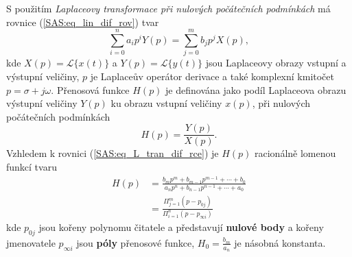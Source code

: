       S použitím \emph{Laplaceovy transformace při nulových počátečních podmínkách} má rovnice
      (\ref{SAS:eq_lin_dif_rov}) tvar
      \begin{equation}\label{SAS:eq_L_tran_dif_rce}
        \sum_{i=0}^na_ip^iY(p)=\sum_{j=0}^mb_jp^jX(p),
      \end{equation}
      kde $X(p)=\mathcal{L}\{x(t)\}$ a $Y(p)=\mathcal{L}\{y(t)\}$ jsou Laplaceovy obrazy vstupní a
      výstupní veličiny, $p$ je Laplaceův operátor derivace a také komplexní kmitočet 
      $p=\sigma+j\omega$. Přenosová funkce $H(p)$ je definována jako podíl Laplaceova obrazu 
      výstupní veličiny $Y(p)$ ku obrazu vstupní veličiny $x(p)$, při nulových počátečních 
      podmínkách
      \begin{equation}\label{SAS:eq_Hp_popis}
          H(p)=\frac{Y(p)}{X(p)}.
      \end{equation}
      Vzhledem k rovnici (\ref{SAS:eq_L_tran_dif_rce}) je $H(p)$ racionálně lomenou funkcí tvaru
      \begin{align}
        H(p)&=\frac{b_mp^m+b_{m-1}p^{m-1}+\cdots+b_0}{a_np^n+b_{n-1}p^{n-1}+\cdots+a_0}  \nonumber\\
            &=\frac{\Pi_{j=1}^m(p-p_{0j})}{\Pi_{i=1}^n(p-p_{\infty i})}            \label{tky:eq002}
      \end{align}
      kde $p_{0j}$ jsou kořeny polynomu čitatele a představují \textbf{nulové body} a kořeny
      jmenovatele $p_{\infty i}$ jsou \textbf{póly} přenosové funkce, $H_0=\frac{b_m}{a_n}$ je
      násobná konstanta.
  
